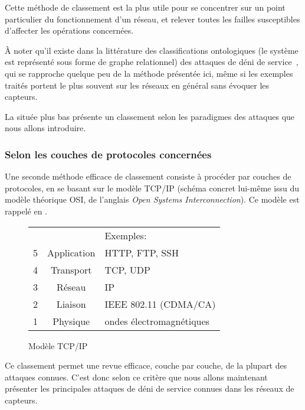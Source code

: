 Cette méthode de classement est la plus utile pour se concentrer sur un point particulier du fonctionnement d'un réseau, et relever toutes les failles susceptibles d'affecter les opérations concernées.

À noter qu'il existe dans la littérature des classifications ontologiques (le système est représenté sous forme de graphe relationnel) des attaques de déni de service~\cite{VS10}, qui se rapproche quelque peu de la méthode présentée ici, même si les exemples traités portent le plus souvent sur les réseaux en général sans évoquer les capteurs.

La  située plus bas présente un classement selon les paradigmes des attaques que nous allons introduire.

    \subsubsection{Selon les couches de protocoles concernées}
Une seconde méthode efficace de classement consiste à procéder par couches de protocoles, en se basant sur le modèle TCP/IP (schéma concret lui-même issu du modèle théorique OSI, de l'anglais \textit{Open Systems Interconnection}).
Ce modèle est rappelé en .
\begin{figure}[!ht]
    \centering
    \begin{tabular}{c |c| l}
        \multicolumn{2}{c}{} & Exemples:\\
        \cline{2-2}
        5 & Application & HTTP, FTP, SSH\\
        \cline{2-2}
        4 & Transport & TCP, UDP\\
        \cline{2-2}
        3 & Réseau & IP\\
        \cline{2-2}
        2 & Liaison & IEEE 802.11 (CDMA/CA)\\
        \cline{2-2}
        1 & Physique & ondes électromagnétiques\\
        \cline{2-2}
     \end{tabular}
    \medskip
    \caption{Modèle TCP/IP}\label{ea:fig:tcpip}
\end{figure}

Ce classement permet une revue efficace, couche par couche, de la plupart des attaques connues.
C'est donc selon ce critère que nous allons maintenant présenter les principales attaques de déni de service connues dans les réseaux de capteurs.
